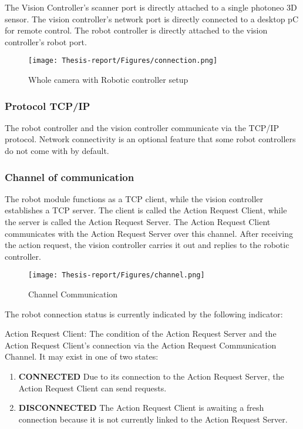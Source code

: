 \documentclass[12pt]{article}
\begin{document}
The Vision Controller's scanner port is directly attached to a single photoneo 3D sensor. 
The vision controller's network port is directly connected to a desktop pC for remote control.
The robot controller is directly attached to the vision controller's robot port\cite{ref2}.

\begin{figure}[h]
    \centering
    \texttt{[image: Thesis-report/Figures/connection.png]}
    \caption{Whole camera with Robotic controller setup\cite{ref2}}
    \label{fig:whole-camera}
\end{figure}

\newpage
 \subsubsection{Protocol TCP/IP}
The robot controller and the vision controller communicate via the TCP/IP protocol. Network connectivity is an optional feature that some robot controllers do not come with by default\cite{ref2}.

\subsubsection{Channel of communication}
The robot module functions as a TCP client, while the vision controller establishes a TCP server. The client is called the Action Request Client, while the server is called the Action Request Server. The Action Request Client communicates with the Action Request Server over this channel. After receiving the action request, the vision controller carries it out and replies to the robotic controller\cite{ref2}.


\begin{figure}[h]
    \centering
    \texttt{[image: Thesis-report/Figures/channel.png]}
    \caption{Channel Communication \cite{ref2}}
    \label{fig:Photoneo Camera}
\end{figure}

The robot connection status is currently indicated by the following indicator:

 Action Request Client: The condition of the Action Request Server and the Action Request Client's connection via the Action Request Communication Channel. It may exist in one of two states: \cite{ref2}
 \begin{enumerate}
     \item  \textbf{CONNECTED} Due to its connection to the Action Request Server, the Action Request Client can send requests\cite{ref2}.
      \item   \textbf{DISCONNECTED} The Action Request Client is awaiting a fresh connection because it is not currently linked to the Action Request Server\cite{ref2}.

 \end{enumerate}
\end{document}

